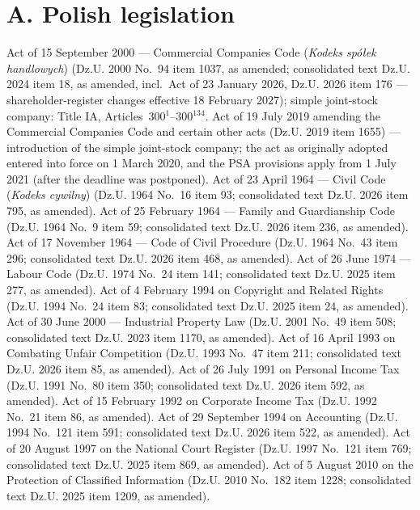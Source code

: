 \section*{A. Polish legislation}
\begin{BibList}
 Act of 15 September 2000 --- Commercial Companies Code (\emph{Kodeks spółek handlowych}) (Dz.U. 2000 No.~94 item 1037, as amended; consolidated text Dz.U. 2024 item 18, as amended, incl.\ Act of 23 January 2026, Dz.U. 2026 item 176 --- shareholder-register changes effective 18 February 2027); simple joint-stock company: Title IA, Articles~300$^{1}$--300$^{134}$.
 Act of 19 July 2019 amending the Commercial Companies Code and certain other acts (Dz.U. 2019 item 1655) --- introduction of the simple joint-stock company; the act as originally adopted entered into force on 1 March 2020, and the PSA provisions apply from 1 July 2021 (after the deadline was postponed).
 Act of 23 April 1964 --- Civil Code (\emph{Kodeks cywilny}) (Dz.U. 1964 No.~16 item 93; consolidated text Dz.U. 2026 item 795, as amended).
 Act of 25 February 1964 --- Family and Guardianship Code (Dz.U. 1964 No.~9 item 59; consolidated text Dz.U. 2026 item 236, as amended).
 Act of 17 November 1964 --- Code of Civil Procedure (Dz.U. 1964 No.~43 item 296; consolidated text Dz.U. 2026 item 468, as amended).
 Act of 26 June 1974 --- Labour Code (Dz.U. 1974 No.~24 item 141; consolidated text Dz.U. 2025 item 277, as amended).
 Act of 4 February 1994 on Copyright and Related Rights (Dz.U. 1994 No.~24 item 83; consolidated text Dz.U. 2025 item 24, as amended).
 Act of 30 June 2000 --- Industrial Property Law (Dz.U. 2001 No.~49 item 508; consolidated text Dz.U. 2023 item 1170, as amended).
 Act of 16 April 1993 on Combating Unfair Competition (Dz.U. 1993 No.~47 item 211; consolidated text Dz.U. 2026 item 85, as amended).
 Act of 26 July 1991 on Personal Income Tax (Dz.U. 1991 No.~80 item 350; consolidated text Dz.U. 2026 item 592, as amended).
 Act of 15 February 1992 on Corporate Income Tax (Dz.U. 1992 No.~21 item 86, as amended).
 Act of 29 September 1994 on Accounting (Dz.U. 1994 No.~121 item 591; consolidated text Dz.U. 2026 item 522, as amended).
 Act of 20 August 1997 on the National Court Register (Dz.U. 1997 No.~121 item 769; consolidated text Dz.U. 2025 item 869, as amended).
 Act of 5 August 2010 on the Protection of Classified Information (Dz.U. 2010 No.~182 item 1228; consolidated text Dz.U. 2025 item 1209, as amended).

\end{BibList}
